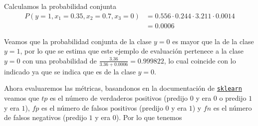 \begin{itemize}
    Calculamos la probabilidad conjunta
    \begin{align*}
        P(y=1, x_1=0.35, x_2=0.7, x_3=0) & = 0.556 \cdot 0.244 \cdot 3.211 \cdot 0.0014 \\
        & = 0.0006
    \end{align*}
    
    Veamos que la probabilidad conjunta de la clase $y=0$ es mayor que la de la clase $y=1$, por lo que se estima que este ejemplo de evaluación pertenece a la clase $y=0$ con una probabilidad de $\frac{3.36}{3.36 + 0.0006} = 0.999822$, lo cual coincide con lo indicado ya que se indica que es de la clase $y=0$.
\end{itemize}


Ahora evaluaremos las métricas, basandonos en la documentación de \href{https://scikit-learn.org/stable/api/sklearn.metrics.html}{\texttt{sklearn}} veamos que $tp$ es el número de verdaderos positivos (predijo $0$ y era $0$ o predijo $1$ y era $1$), $fp$ es el número de falsos positivos (predijo $0$ y era $1$) y $fn$ es el número de falsos negativos (predijo $1$ y era $0$). Por lo que tenemos
